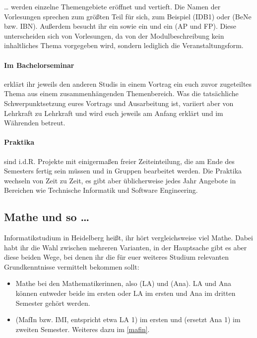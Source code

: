 \dots{} werden einzelne Themengebiete eröffnet und vertieft. Die Namen der Vorlesungen sprechen zum größten Teil für sich, zum Beispiel  (\gls{IDB1}) oder  (\gls{BeNe} bzw. IBN). Außerdem besucht ihr ein  sowie ein  und ein  (\gls{AP} und \gls{FP}). Diese unterscheiden sich von Vorlesungen, da von der Modulbeschreibung kein inhaltliches Thema vorgegeben wird, sondern lediglich die Veranstaltungsform.

\paragraph*{Im Bachelorseminar} erklärt ihr jeweils den anderen Studis in einem Vortrag ein euch zuvor zugeteiltes Thema aus einem zusammenhängenden Themenbereich. Was die tatsächliche Schwerpunktsetzung eures Vortrags und Ausarbeitung ist, variiert aber von Lehrkraft zu Lehrkraft und wird euch jeweils am Anfang erklärt und im Währenden betreut.

\paragraph*{Praktika} sind i.d.R. Projekte mit einigermaßen freier Zeiteinteilung, die am Ende des Semesters fertig sein müssen und in Gruppen bearbeitet werden. Die Praktika wechseln von Zeit zu Zeit, es gibt aber üblicherweise jedes Jahr Angebote in Bereichen wie Technische Informatik und Software Engineering.

\subsection{Mathe und so \dots}

Informatikstudium in Heidelberg heißt, ihr hört vergleichsweise viel Mathe. Dabei habt ihr die Wahl zwischen mehreren Varianten, in der Hauptsache gibt es aber diese beiden Wege, bei denen ihr die für euer weiteres Studium relevanten Grundkenntnisse vermittelt bekommen sollt:

\begin{itemize}
    \item Mathe bei den Mathematikerinnen, also  (\gls{LA}) und  (\gls{Ana}). \gls{LA} und \gls{Ana} können entweder beide im ersten oder \gls{LA} im ersten und \gls{Ana} im dritten Semester gehört werden.
    \item {} (\gls{MafIn} bzw. IMI, entspricht etwa \gls{LA} 1) im ersten und  (ersetzt \gls{Ana} 1) im zweiten Semester. Weiteres dazu im \autoref{mafin}.
\end{itemize}


